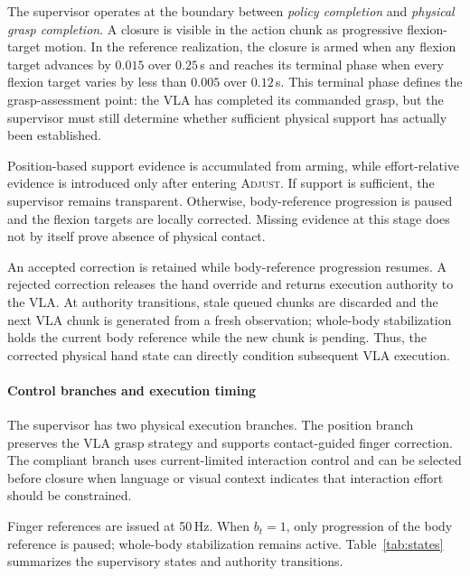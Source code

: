 \documentclass[letterpaper,10pt,conference]{ieeeconf}
\newcommand{\state}[1]{\textsc{#1}}
\begin{document}
The supervisor operates at the boundary between \emph{policy completion} and
\emph{physical grasp completion}. A closure is visible in the action chunk as
progressive flexion-target motion. In the reference realization, the closure
is armed when any flexion target advances by $0.015$ over $0.25$\,s and
reaches its terminal phase when every flexion target varies by less than
$0.005$ over $0.12$\,s. This terminal phase defines the grasp-assessment point:
the VLA has completed its commanded grasp, but the supervisor must still
determine whether sufficient physical support has actually been established.

Position-based support evidence is accumulated from arming, while
effort-relative evidence is introduced only after entering \state{Adjust}.
If support is sufficient, the supervisor remains transparent. Otherwise,
body-reference progression is paused and the flexion targets are locally
corrected. Missing evidence at this stage does not by itself prove absence of
physical contact.

An accepted correction is retained while body-reference progression resumes.
A rejected correction releases the hand override and returns execution
authority to the VLA. At authority transitions, stale queued chunks are
discarded and the next VLA chunk is generated from a fresh observation;
whole-body stabilization holds the current body reference while the new chunk
is pending. Thus, the corrected physical hand state can directly condition
subsequent VLA execution.

\paragraph{Control branches and execution timing}
The supervisor has two physical execution branches. The position branch
preserves the VLA grasp strategy and supports contact-guided finger correction.
The compliant branch uses current-limited interaction control and can be
selected before closure when language or visual context indicates that
interaction effort should be constrained.

Finger references are issued at 50\,Hz. When $b_t=1$, only progression of the
body reference is paused; whole-body stabilization remains active. Table~\ref{tab:states} summarizes the supervisory states and authority
transitions.
\end{document}
